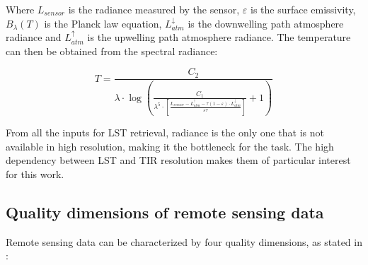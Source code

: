         Where $L_{sensor}$ is the radiance measured by the sensor, $\varepsilon$ is the surface emissivity, $B_{\lambda}(T)$ is the Planck law equation, $L_{atm}^{\downarrow}$ is the downwelling path atmosphere radiance and $L_{atm}^{\uparrow}$ is the upwelling path atmosphere radiance. 
        The temperature can then be obtained from the spectral radiance:

        \begin{equation}
            T = \frac{C_2}{\lambda \cdot \log\left(\frac{C_1}{\lambda^5 \cdot \left[ \frac{L_{sensor} - L_{atm}^{\uparrow}- \tau (1 - \varepsilon) \cdot L_{atm}^{\downarrow}}{\varepsilon \tau}  \right]}+1\right)}
        \end{equation}

        From all the inputs for LST retrieval, radiance is the only one that is not available in high resolution, making it the bottleneck for the task. The high dependency between LST and TIR resolution makes them of particular interest for this work.
        
       

    \subsection{Quality dimensions of remote sensing data}

    Remote sensing data can be characterized by four quality dimensions, as stated in \cite{HORNING20082986}:

